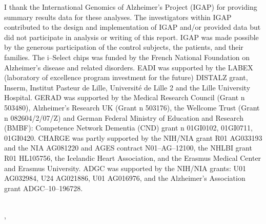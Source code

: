 I thank the International Genomics of Alzheimer's Project (IGAP) for providing summary results data for these analyses. The investigators within IGAP contributed to the design and implementation of IGAP and/or provided data but did not participate in analysis or writing of this report. IGAP was made possible by the generous participation of the control subjects, the patients, and their families. The i–Select chips was funded by the French National Foundation on Alzheimer's disease and related disorders. EADI was supported by the LABEX (laboratory of excellence program investment for the future) DISTALZ grant, Inserm, Institut Pasteur de Lille, Université de Lille 2 and the Lille University Hospital. GERAD was supported by the Medical Research Council (Grant n 503480), Alzheimer's Research UK (Grant n 503176), the Wellcome Trust (Grant n 082604/2/07/Z) and German Federal Ministry of Education and Research (BMBF): Competence Network Dementia (CND) grant n 01GI0102, 01GI0711, 01GI0420. CHARGE was partly supported by the NIH/NIA grant R01 AG033193 and the NIA AG081220 and AGES contract N01–AG–12100, the NHLBI grant R01 HL105756, the Icelandic Heart Association, and the Erasmus Medical Center and Erasmus University. ADGC was supported by the NIH/NIA grants: U01 AG032984, U24 AG021886, U01 AG016976, and the Alzheimer's Association grant ADGC–10–196728.





\begin{center}
\end{center}

\begin{flushright}  
	\MakeUppercase{\authorName}
\end{flushright}  

\begin{center}
    \textbf{\schoolName}\\
    \textbf{\schoolPlace}, \textbf{\thesisDate} 
\end{center}
